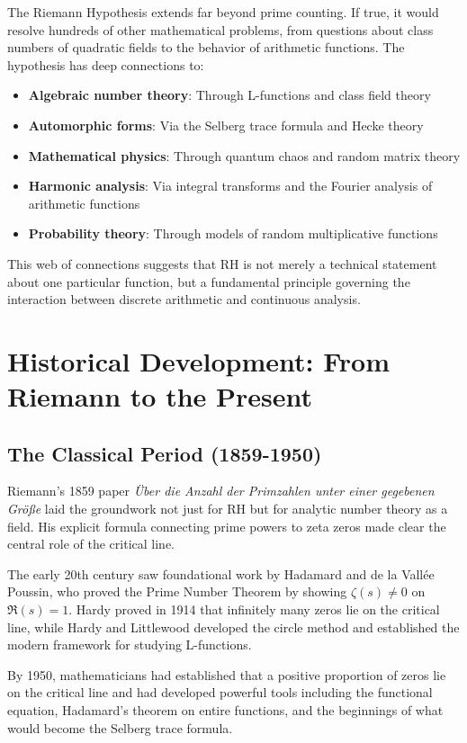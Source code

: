 The Riemann Hypothesis extends far beyond prime counting. If true, it would resolve hundreds of other mathematical problems, from questions about class numbers of quadratic fields to the behavior of arithmetic functions. The hypothesis has deep connections to:

\begin{itemize}
\item \textbf{Algebraic number theory}: Through L-functions and class field theory
\item \textbf{Automorphic forms}: Via the Selberg trace formula and Hecke theory
\item \textbf{Mathematical physics}: Through quantum chaos and random matrix theory
\item \textbf{Harmonic analysis}: Via integral transforms and the Fourier analysis of arithmetic functions
\item \textbf{Probability theory}: Through models of random multiplicative functions
\end{itemize}

This web of connections suggests that RH is not merely a technical statement about one particular function, but a fundamental principle governing the interaction between discrete arithmetic and continuous analysis.

\section*{Historical Development: From Riemann to the Present}

\subsection*{The Classical Period (1859-1950)}

Riemann's 1859 paper \emph{\"Uber die Anzahl der Primzahlen unter einer gegebenen Gr\"o{\ss}e} laid the groundwork not just for RH but for analytic number theory as a field. His explicit formula connecting prime powers to zeta zeros made clear the central role of the critical line.

The early 20th century saw foundational work by Hadamard and de la Vall\'ee Poussin, who proved the Prime Number Theorem by showing $\zeta(s) \neq 0$ on $\Re(s) = 1$. Hardy proved in 1914 that infinitely many zeros lie on the critical line, while Hardy and Littlewood developed the circle method and established the modern framework for studying L-functions.

By 1950, mathematicians had established that a positive proportion of zeros lie on the critical line and had developed powerful tools including the functional equation, Hadamard's theorem on entire functions, and the beginnings of what would become the Selberg trace formula.

